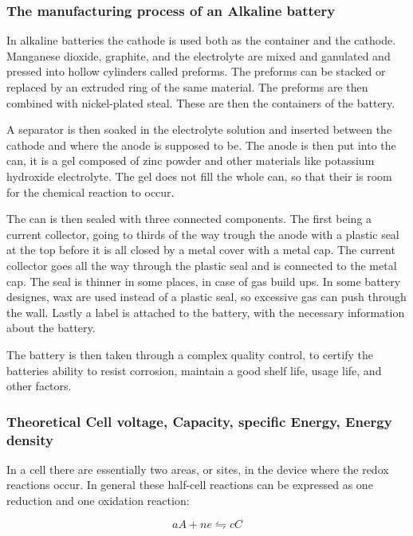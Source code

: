 \subsubsection{The manufacturing process of an Alkaline battery}
In alkaline batteries the cathode is used both as the container and the cathode. Manganese dioxide, graphite, and the electrolyte are mixed and ganulated and pressed into hollow cylinders called preforms. The preforms can be stacked or replaced by an extruded ring of the same material. The preforms are then combined with nickel-plated steal. These are then the containers of the battery. 

A separator is then soaked in the electrolyte solution and inserted between the cathode and where the anode is supposed to be. The anode is then put into the can, it is a gel composed of zinc powder and other materials like potassium hydroxide electrolyte. The gel does not fill the whole can, so that their is room for the chemical reaction to occur. 

The can is then sealed with three connected components. The first being a current collector, going to thirds of the way trough the anode with a plastic seal at the top before it is all closed by a metal cover with a metal cap. The current collector goes all the way through the plastic seal and is connected to the metal cap. The seal is thinner in some places, in case of gas build ups. In some battery designes, wax are used instead of a plastic seal, so excessive gas can push through the wall. Lastly a label is attached to the battery, with the necessary information about the battery. 

The battery is then taken through a complex quality control, to certify the batteries ability to resist corrosion, maintain a good shelf life, usage life, and other factors. 






\subsubsection{Theoretical Cell voltage, Capacity, specific Energy, Energy density}\label{sec:msp}
	
	In a cell there are essentially two areas, or sites, in the device where the redox reactions occur. In general these half-cell reactions can be expressed as one reduction and one oxidation reaction:
	
	$$aA + ne \leftrightharpoons cC $$
	
